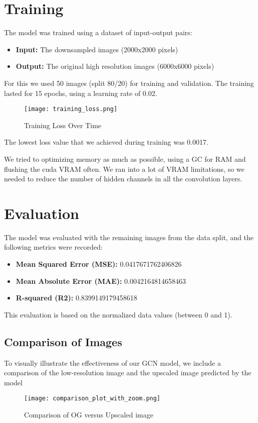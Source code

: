 \documentclass[runningheads,a4paper,11pt]{report}
\begin{document}
\section{Training} The model was trained using a dataset of input-output pairs:
\begin{itemize}
    \item \textbf{Input:} The downsampled images (2000x2000 pixels) 
    \item \textbf{Output:} The original high resolution images (6000x6000 pixels)
    
    
\end{itemize}
For this we used 50 images (split 80/20) for training and validation. The training lasted for 15 epochs, using a learning rate of 0.02. 
\begin{figure}[H]
    \centering
    \texttt{[image: training\_loss.png]}
    \caption{Training Loss Over Time}
    \label{fig:trainingLoss}
\end{figure}

The lowest loss value that we achieved during training was 0.0017.


We tried to optimizing memory as much as possible, using a GC for RAM and flushing the cuda VRAM often. We ran into a lot of VRAM limitations, so we needed to reduce the number of hidden channels in all the convolution layers.


\section{Evaluation} The model was evaluated with the remaining images from the data split, and the following metrics were recorded:
\begin{itemize} 
    \item \textbf{Mean Squared Error (MSE):} 0.0417671762406826
    \item \textbf{Mean Absolute Error (MAE):} 0.0042164814658463 
    \item \textbf{R-squared (R2):} 0.8399149179458618
\end{itemize}

This evaluation is based on the normalized data values (between 0 and 1).

\subsection{Comparison of Images}
To visually illustrate the effectiveness of our GCN model, we include a comparison of the low-resolution image and the upscaled image predicted by the model
\begin{figure}[H]
    \centering \texttt{[image: comparison\_plot\_with\_zoom.png]}
    \caption{Comparison of OG versus Upscaled image}
    \label{fig:comparison}
\end{figure}
\end{document}
